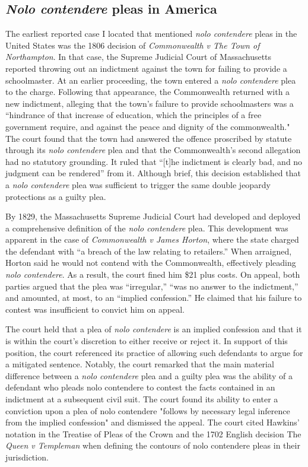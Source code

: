\subsection{\textit{Nolo contendere} pleas in America}
The earliest reported case I located that mentioned \textit{nolo contendere} pleas in the United States was the 1806 decision of \textit{Commonwealth v The Town of Northampton}. In that case, the Supreme Judicial Court of Massachusetts reported throwing out an indictment against the town for failing to provide a schoolmaster. At an earlier proceeding, the town entered a \textit{nolo contendere} plea to the charge. Following that appearance, the Commonwealth returned with a new indictment, alleging that the town's failure to provide schoolmasters was a ``hindrance of that increase of education, which the principles of a free government require, and against the peace and dignity of the commonwealth." The court found that the town had answered the offence proscribed by statute through its \textit{nolo contendere} plea and that the Commonwealth's second allegation had no statutory grounding. It ruled that ``[t]he indictment is clearly bad, and no judgment can be rendered'' from it. Although brief, this decision established that a \textit{nolo contendere} plea was sufficient to trigger the same double jeopardy protections as a guilty plea.

By 1829, the Massachusetts Supreme Judicial Court had developed and deployed a comprehensive definition of the \textit{nolo contendere} plea. This development was apparent in the case of \textit{Commonwealth v James Horton}, where the state charged the defendant with ``a breach of the law relating to retailers.'' When arraigned, Horton said he would not contend with the Commonwealth, effectively pleading \textit{nolo contendere}. As a result, the court fined him \$21 plus costs. On appeal, both parties argued that the plea was ``irregular,'' ``was no answer to the indictment,'' and amounted, at most, to an ``implied confession.'' He claimed that his failure to contest was insufficient to convict him on appeal.

The court held that a plea of \textit{nolo contendere} is an implied confession and that it is within the court's discretion to either receive or reject it. In support of this position, the court referenced its practice of allowing such defendants to argue for a mitigated sentence. Notably, the court remarked that the main material difference between a \textit{nolo contendere} plea and a guilty plea was the ability of a defendant who pleads nolo contendere to contest the facts contained in an indictment at a subsequent civil suit. The court found its ability to enter a conviction upon a plea of nolo contendere "follows by necessary legal inference from the implied confession" and dismissed the appeal. The court cited Hawkins' notation in the Treatise of Pleas of the Crown and the 1702 English decision The \textit{Queen v Templeman} when defining the contours of nolo contendere pleas in their jurisdiction.

